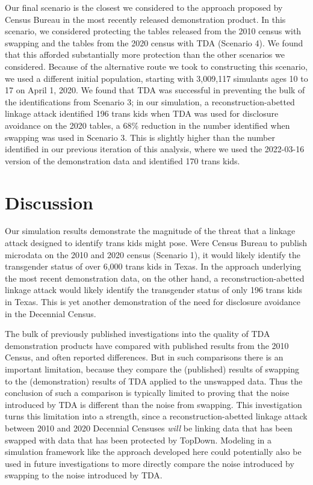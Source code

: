 \documentclass{jpc} %
\theoremstyle{plain}\newtheorem{satz}[thm]{Satz} %
\begin{document}
Our final scenario is the closest we considered to the approach proposed by Census Bureau in the most recently released demonstration product. In this scenario, we considered protecting the tables released from the 2010 census with swapping and the tables from the 2020 census with TDA (Scenario 4).  We found that this afforded substantially more protection than the other scenarios we considered.  Because of the alternative route we took to constructing this scenario, we used a different initial population, starting with 3,009,117 simulants ages 10 to 17 on April 1, 2020.  We found that TDA was successful in preventing the bulk of the identifications from Scenario 3; in our simulation, a reconstruction-abetted linkage attack identified 196 trans kids when TDA was used for disclosure avoidance on the 2020 tables, a 68\% reduction in the number identified when swapping was used in Scenario 3.  This is slightly higher than the number identified in our previous iteration of this analysis, where we used the 2022-03-16 version of the demonstration data and identified 170 trans kids.


\section{Discussion}

Our simulation results demonstrate the magnitude of the threat that a linkage attack designed to identify trans kids might pose.  Were Census Bureau to publish microdata on the 2010 and 2020 census (Scenario 1), it would likely identify the transgender status of over 6,000 trans kids in Texas.  In the approach underlying the most recent demonstration data, on the other hand, a reconstruction-abetted linkage attack would likely identify the transgender status of only 196 trans kids in Texas.  This is yet another demonstration of the need for disclosure avoidance in the Decennial Census.

The bulk of previously published investigations into the quality of TDA demonstration products have compared with published results from the 2010 Census, and often reported differences.  But in such comparisons there is an important limitation, because they compare the (published) results of swapping to the (demonstration) results of TDA applied to the unswapped data.  Thus the conclusion of such a comparison is typically limited to proving that the noise introduced by TDA is different than the noise from swapping.
This investigation turns this limitation into a strength, since a reconstruction-abetted linkage attack between 2010 and 2020 Decennial Censuses \emph{will} be linking data that has been swapped with data that has been protected by TopDown.
Modeling in a simulation framework like the approach developed here could potentially also be used in future investigations to more directly compare the noise introduced by swapping to the noise introduced by TDA.
\end{document}
